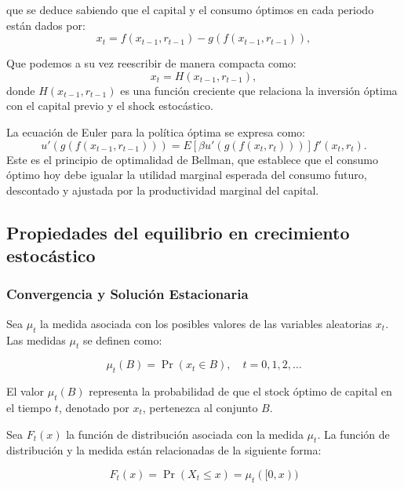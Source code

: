\documentclass[a4paper,12pt]{article}
\begin{document}
que se deduce sabiendo que el capital y el consumo óptimos en cada periodo están dados por:
\begin{equation}
x_t = f(x_{t-1}, r_{t-1}) - g(f(x_{t-1}, r_{t-1})),
\end{equation}

Que podemos a su vez reescribir de manera compacta como:
\begin{equation}
x_t = H(x_{t-1}, r_{t-1}),
\end{equation}
donde $H(x_{t-1}, r_{t-1})$ es una función creciente que relaciona la inversión óptima con el capital previo y el shock estocástico.

La ecuación de Euler para la política óptima se expresa como:
\begin{equation}
u'(g(f(x_{t-1}, r_{t-1}))) = E[\beta u'(g(f(x_t, r_t)))] f'(x_t, r_t).
\end{equation}
Este es el principio de optimalidad de Bellman, que establece que el consumo óptimo hoy debe igualar la utilidad marginal esperada del consumo futuro, descontado y ajustada por la productividad marginal del capital.


\subsection{Propiedades del equilibrio en crecimiento estocástico}

\subsubsection{Convergencia y Solución Estacionaria}

Sea $\mu_t$ la medida asociada con los posibles valores de las variables aleatorias $x_t$. Las medidas $\mu_t$ se definen como:

		\begin{equation}
\mu_t(B) = \Pr(x_t \in B), \quad t = 0, 1, 2, \ldots
		\end{equation}

El valor $\mu_t(B)$ representa la probabilidad de que el stock óptimo de capital en el tiempo $t$, denotado por $x_t$, pertenezca al conjunto $B$.

Sea $F_t(x)$ la función de distribución asociada con la medida $\mu_t$. La función de distribución y la medida están relacionadas de la siguiente forma:

		\begin{equation}
F_t(x) = \Pr(X_t \leq x) = \mu_t([0, x))
		\end{equation}
\end{document}

